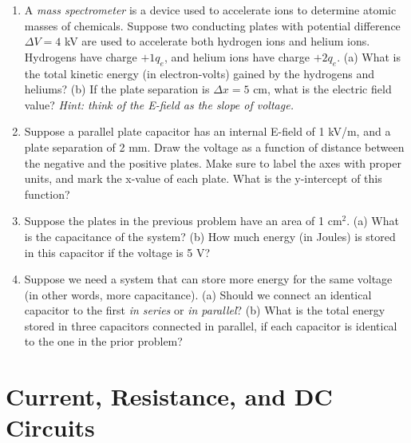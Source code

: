 \documentclass[10pt]{article}
\begin{document}
\begin{enumerate}
\item A \textit{mass spectrometer} is a device used to accelerate ions to determine atomic masses of chemicals.  Suppose two conducting plates with potential difference $\Delta V = 4$ kV are used to accelerate both hydrogen ions and helium ions.  Hydrogens have charge $+1 q_e$, and helium ions have charge $+2 q_e$.  (a) What is the total kinetic energy (in electron-volts) gained by the hydrogens and heliums? (b) If the plate separation is $\Delta x = 5$ cm, what is the electric field value?  \textit{Hint: think of the E-field as the slope of voltage.} \\ \vspace{5cm}
\item Suppose a parallel plate capacitor has an internal E-field of 1 kV/m, and a plate separation of 2 mm.  Draw the voltage as a function of distance between the negative and the positive plates.  Make sure to label the axes with proper units, and mark the x-value of each plate.  What is the y-intercept of this function? \\ \vspace{2cm}
\item Suppose the plates in the previous problem have an area of 1 cm$^2$.  (a) What is the capacitance of the system? (b) How much energy (in Joules) is stored in this capacitor if the voltage is 5 V? \\ \vspace{3cm}
\item Suppose we need a system that can store more energy for the same voltage (in other words, more capacitance).  (a) Should we connect an identical capacitor to the first \textit{in series} or \textit{in parallel}?  (b) What is the total energy stored in three capacitors connected in parallel, if each capacitor is identical to the one in the prior problem? \\ \vspace{2cm}
\end{enumerate}

\section{Current, Resistance, and DC Circuits}
\end{document}
